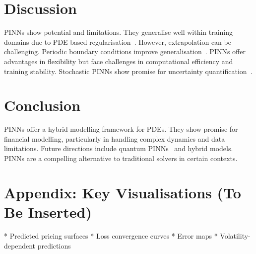 \documentclass[12pt,a4paper]{article}
\begin{document}
\section{Discussion}

PINNs show potential and limitations. They generalise well within training domains due to PDE-based regularisation~\cite{raissi2019physics, cuomo2022scientific}. However, extrapolation can be challenging. Periodic boundary conditions improve generalisation~\cite{zhu2022periodic}. PINNs offer advantages in flexibility but face challenges in computational efficiency and training stability. Stochastic PINNs show promise for uncertainty quantification~\cite{zang2020adaptive, yang2021bpinns}.

\section{Conclusion}

PINNs offer a hybrid modelling framework for PDEs. They show promise for financial modelling, particularly in handling complex dynamics and data limitations. Future directions include quantum PINNs~\cite{zhang2022quantum, mcardle2020quantum} and hybrid models. PINNs are a compelling alternative to traditional solvers in certain contexts.

\section*{Appendix: Key Visualisations (To Be Inserted)}

* Predicted pricing surfaces
* Loss convergence curves
* Error maps
* Volatility-dependent predictions



\end{document}
